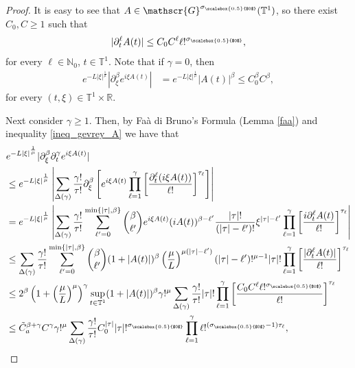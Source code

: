\documentclass[11pt,reqno]{amsart}
\numberwithin{equation}{section}
\theoremstyle{definition}
\theoremstyle{definition}
\newcommand{\T}{\mathbb{T}}
\newcommand{\R}{\mathbb{R}}
\newcommand{\N}{\mathbb{N}}
\newcommand{\sigmac}{\sigma_{\scalebox{0.5}{$0$}}}
\begin{document}
\begin{proof}
    It is easy to see that $A\in\mathscr{G}^{\sigmac}(\T^1)$, so there exist $C_0,C\geq 1$ such that
    \begin{equation}\label{ineq_gevrey_A}
        |\partial_t^\ell A(t)|\leq C_0C^{\ell}\ell!^{\sigmac},
    \end{equation}
    for every $\ell\in\N_0$,  $t\in\T^1$. Note that if $\gamma=0$, then 
    \begin{align*}
         e^{-L|\xi|^{\frac{1}{\mu}}}\left|\partial_\xi^\beta e^{i\xi A(t)}\right|&=         e^{-L|\xi|^{\frac{1}{\mu}}}\left|A(t)\right|^\beta \leq C_0^\beta C^\beta,
    \end{align*}
    for every $(t,\xi)\in\T^1\times\R$. 

 Next consider $\gamma\geq 1$. Then, by Fa\`a di Bruno's Formula (Lemma \ref{faa}) and inequality \eqref{ineq_gevrey_A} we have that
    \begin{align*}
        & e^{-L|\xi|^{\frac{1}{\mu}}}|\partial_\xi^{\beta}\partial_t^\gamma e^{i\xi A(t)}|\\&\leq e^{-L|\xi|^{\frac{1}{\mu}}}\left|\sum_{\Delta(\gamma)}\frac{\gamma!}{\tau!}\partial_\xi^\beta\left[e^{i\xi A(t)}\prod_{\ell=1}^{\gamma}\left[\frac{\partial_t^\ell(i\xi A(t))}{\ell!}\right]^{\tau_\ell}\right]\right|\\
        & =e^{-L|\xi|^{\frac{1}{\mu}}}\left|\sum_{\Delta(\gamma)}\frac{\gamma!}{\tau!}\sum_{\ell'=0}^{\min\{|\tau|,\beta\}}\binom{\beta}{\ell'}e^{i\xi A(t)}(iA(t))^{\beta-\ell'}\frac{|\tau|!}{(|\tau|-\ell')!}\xi^{|\tau|-\ell'}\prod_{\ell=1}^{\gamma}\left[\frac{i\partial_t^\ell A(t)}{\ell!}\right]^{\tau_\ell}\right|\\
        &\leq \sum_{\Delta(\gamma)}\frac{\gamma!}{\tau!}\sum_{\ell'=0}^{\min\{|\tau|,\beta\}}\binom{\beta}{\ell'}(1+|A(t)|)^{\beta}\left(\frac{\mu}{L}\right)^{\mu(|\tau|-\ell')}(|\tau|-\ell')!^{\mu-1}|\tau|!\prod_{\ell=1}^{\gamma}\left[\frac{|\partial_t^\ell A(t)|}{\ell!}\right]^{\tau_\ell}\\
        &\leq 2^{\beta}\left(1+\left(\frac{\mu}{L}\right)^{\mu}\right)^{\gamma}\sup_{t\in\T^1}(1+|A(t)|)^\beta\gamma!^{\mu}\sum_{\Delta(\gamma)}\frac{\gamma!}{\tau!}|\tau|!\prod_{\ell=1}^{\gamma}\left[\frac{C_0C^{\ell}\ell!^{\sigmac}}{\ell!}\right]^{\tau_\ell}\\
        &\leq  \tilde{C}_a^{\beta+\gamma}C^{\gamma}\gamma!^{\mu}\sum_{\Delta(\gamma)}\frac{\gamma!}{\tau!}C_0^{|\tau|} |\tau|!^{\sigmac}\prod_{\ell=1}^{\gamma}\ell!^{({\sigmac}-1)\tau_\ell},
    \end{align*}

\end{proof}
\end{document}
